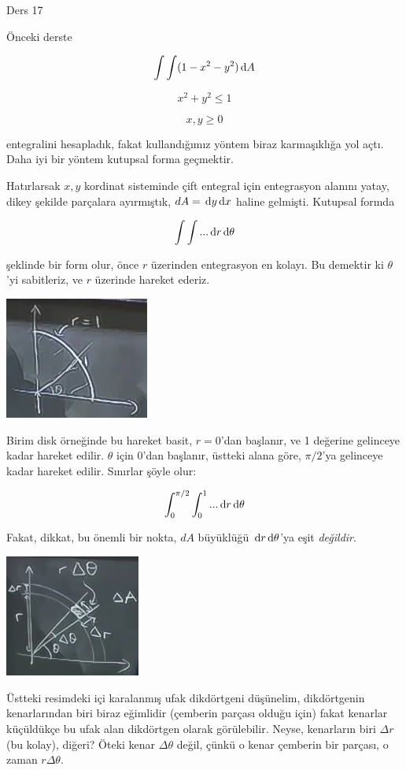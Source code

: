 \documentclass[12pt,fleqn]{article}\usepackage{../../common}
\begin{document}
Ders 17

Önceki derste 

$$ \int \int (1-x^2-y^2) \,\mathrm{d} A $$

$$ x^2+y^2 \le 1 $$

$$ x,y \ge 0 $$

entegralini hesapladık, fakat kullandığımız yöntem biraz karmaşıklığa yol
açtı. Daha iyi bir yöntem kutupsal forma geçmektir. 

Hatırlarsak $x,y$ kordinat sisteminde çift entegral için entegrasyon alanını
yatay, dikey şekilde parçalara ayırmıştık, $dA = \,\mathrm{d} y \,\mathrm{d} x$ haline
gelmişti. Kutupsal formda

$$ \int \int  ... \,\mathrm{d} r \,\mathrm{d} \theta$$

şeklinde bir form olur, önce $r$ üzerinden entegrasyon en kolayı. Bu
demektir ki $\theta$'yi sabitleriz, ve $r$ üzerinde hareket ederiz. 

\includegraphics[height=4cm]{17_1.png}

Birim disk örneğinde bu hareket basit, $r=0$'dan başlanır, ve 1 değerine
gelinceye kadar hareket edilir. $\theta$ için 0'dan başlanır, üstteki alana
göre, $\pi/2$'ya gelinceye kadar hareket edilir. Sınırlar şöyle olur:

$$ \int_0^{\pi/2} \int_0^1  ... \,\mathrm{d} r \,\mathrm{d} \theta$$

Fakat, dikkat, bu önemli bir nokta, $dA$ büyüklüğü $\,\mathrm{d} r \,\mathrm{d} \theta$'ya eşit
{\em değildir}.

\includegraphics[height=4cm]{17_2.png}

Üstteki resimdeki içi karalanmış ufak dikdörtgeni düşünelim, dikdörtgenin
kenarlarından biri biraz eğimlidir (çemberin parçası olduğu için) fakat kenarlar
küçüldükçe bu ufak alan dikdörtgen olarak görülebilir. Neyse, kenarların biri
$\Delta r$ (bu kolay), diğeri? Öteki kenar $\Delta \theta$ değil, çünkü o kenar
çemberin bir parçası, o zaman $r \Delta \theta$.
\end{document}
